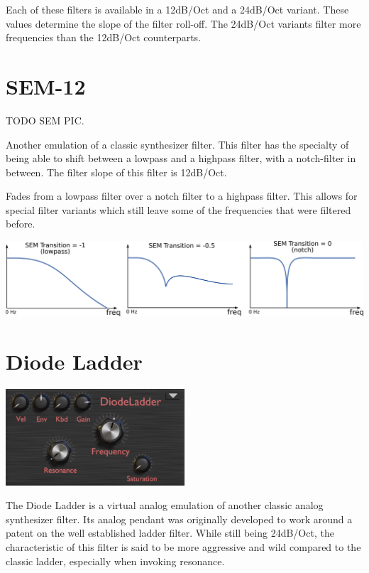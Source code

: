 Each of these filters is available in a 12dB/Oct and a 24dB/Oct variant. These values determine the slope of the filter roll-off. The 24dB/Oct variants filter more frequencies than the 12dB/Oct counterparts.

\section{SEM-12}

TODO SEM PIC.

Another emulation of a classic synthesizer filter. This filter has the specialty of being able to shift between a lowpass and a highpass filter, with a notch-filter in between. The filter slope of this filter is 12dB/Oct.

{Fades from a lowpass filter over a notch filter to a highpass filter. This allows for special filter variants which still leave some of the frequencies that were filtered before.

    \begin{center}
        \includegraphics[width=\textwidth]{graphics/SEM_transition.png}
    \end{center}
}

\section{Diode Ladder}
\begin{center}
    \includegraphics[width=0.5\textwidth]{graphics/diode_filter.png}
\end{center}

The Diode Ladder is a virtual analog emulation of another classic analog synthesizer filter. Its analog pendant was originally developed to work around a patent on the well established ladder filter. While still being 24dB/Oct, the characteristic of this filter is said to be more aggressive and wild compared to the classic ladder, especially when invoking resonance.

